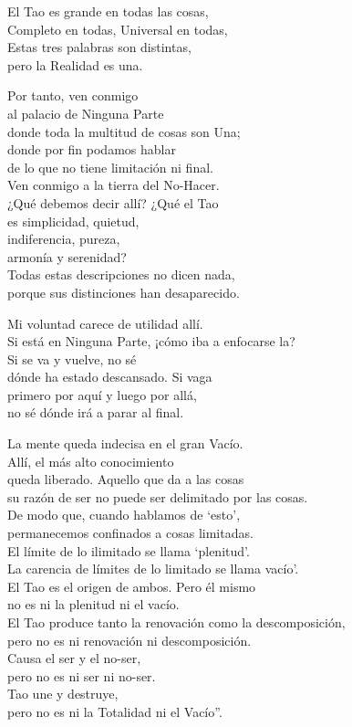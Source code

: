 \documentclass[book,b5paper,hidelinks,final]{memoir}
\begin{document}
	El Tao es grande en todas las cosas,\\
	Completo en todas, Universal en todas,\\
	Estas tres palabras son distintas,\\
	pero la Realidad es una.
	
	Por tanto, ven conmigo\\
	al palacio de Ninguna Parte\\
	donde toda la multitud de cosas son Una;\\
	donde por fin podamos hablar\\
	de lo que no tiene limitación ni final.\\
	Ven conmigo a la tierra del No-Hacer.\\
	¿Qué debemos decir allí? ¿Qué el Tao\\
	es simplicidad, quietud,\\
	indiferencia, pureza,\\
	armonía y serenidad?\\
	Todas estas descripciones no dicen nada,\\
	porque sus distinciones han desaparecido.
	
	Mi voluntad carece de utilidad allí.\\
	Si está en Ninguna Parte, ¡cómo iba a enfocarse la?\\
	Si se va y vuelve, no sé\\
	dónde ha estado descansado. Si vaga\\
	primero por aquí y luego por allá,\\
	no sé dónde irá a parar al final.
	
	La mente queda indecisa en el gran Vacío.\\
	Allí, el más alto conocimiento\\
	queda liberado. Aquello que da a las cosas\\
	su razón de ser no puede ser delimitado por las cosas.\\
	De modo que, cuando hablamos de `esto',\\
	permanecemos confinados a cosas limitadas.\\
	El límite de lo ilimitado se llama `plenitud'.\\
	La carencia de límites de lo limitado se llama vacío'.\\
	El Tao es el origen de ambos. Pero él mismo\\
	no es ni la plenitud ni el vacío.\\
	El Tao produce tanto la renovación como la descomposición,\\
	pero no es ni renovación ni descomposición.\\
	Causa el ser y el no-ser,\\
	pero no es ni ser ni no-ser.\\
	Tao une y destruye,\\
	pero no es ni la Totalidad ni el Vacío''.
	
\end{document}
